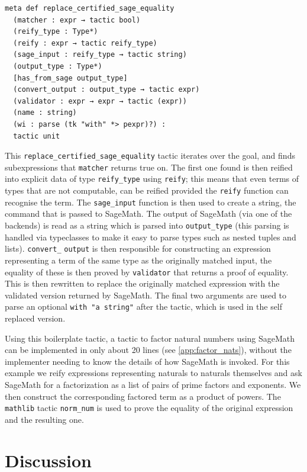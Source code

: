 \documentclass[sigplan,10pt,nonacm,
screen]{acmart} \settopmatter{printfolios=true,printccs=false,printacmref=false}
\newcommand{\mathlib}{\lstinline{mathlib}\xspace}
\begin{document}
\begin{lstlisting}
meta def replace_certified_sage_equality
  (matcher : expr → tactic bool)
  (reify_type : Type*)
  (reify : expr → tactic reify_type)
  (sage_input : reify_type → tactic string)
  (output_type : Type*)
  [has_from_sage output_type]
  (convert_output : output_type → tactic expr)
  (validator : expr → expr → tactic (expr))
  (name : string)
  (wi : parse (tk "with" *> pexpr)?) :
  tactic unit
\end{lstlisting}
This \lstinline{replace_certified_sage_equality} tactic iterates over the goal, and finds subexpressions that \lstinline{matcher} returns true on.
The first one found is then reified into explicit data of type \lstinline{reify_type} using \lstinline{reify}; this means that even terms of types that are not computable, can be reified provided the \lstinline{reify} function can recognise the term.
%
The \lstinline{sage_input} function is then used to create a string, the command that is passed to SageMath.
The output of SageMath (via one of the backends) is read as a string which is parsed into \lstinline{output_type} (this parsing is handled via typeclasses to make it easy to parse types such as nested tuples and lists).
%
\lstinline{convert_}\-%
\lstinline{output} is then responsible for constructing an expression representing a term of the same type as the originally matched input, the equality of these is then proved by \lstinline{validator} that returns a proof of equality. This is then rewritten to replace the originally matched expression with the validated version returned by SageMath.
%
The final two arguments are used to parse an optional \lstinline{with "a string"} after the tactic, which is used in the self replaced version.

Using this boilerplate tactic, a tactic to factor natural numbers using SageMath can be implemented in only about 20 lines (see \cref{app:factor_nats}), without the implementer needing to know the details of how SageMath is invoked.
For this example we reify expressions representing naturals to naturals themselves and ask SageMath for a factorization as a list of pairs of prime factors and exponents. We then construct the corresponding factored term as a product of powers.
The \mathlib tactic \lstinline{norm_num} is used to prove the equality of the original expression and the resulting one.



\section{Discussion}
\end{document}
